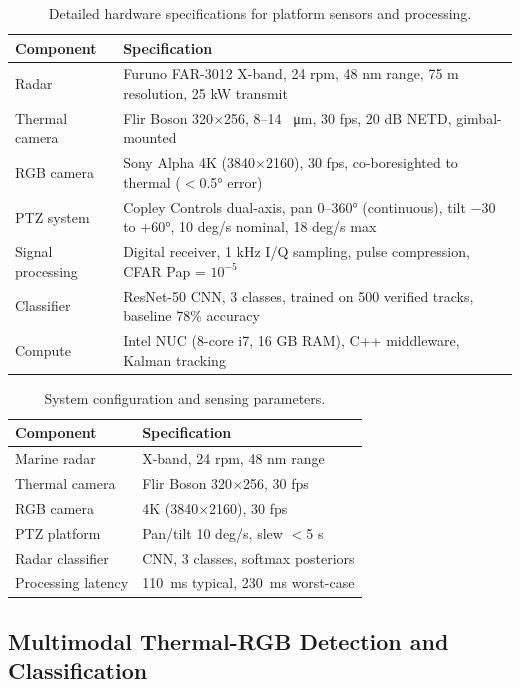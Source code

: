 \documentclass[conf]{asmeconf}
\begin{document}
\begin{table}[t]
\caption{Detailed hardware specifications for platform sensors and processing.}
\label{tab:hardware_detail}
\centering
\begin{tabular}{@{}lp{5cm}@{}}
\toprule
Component & Specification \\
\midrule
Radar & Furuno FAR-3012 X-band, 24 rpm, 48 nm range, 75 m resolution, 25 kW transmit \\
\midrule
Thermal camera & Flir Boson 320$\times$256, 8--14 \SI{}{\micro m}, 30 fps, 20 dB NETD, gimbal-mounted \\
\midrule
RGB camera & Sony Alpha 4K (3840$\times$2160), 30 fps, co-boresighted to thermal ($<$0.5° error) \\
\midrule
PTZ system & Copley Controls dual-axis, pan 0--360° (continuous), tilt $-30$ to $+60°$, 10 deg/s nominal, 18 deg/s max \\
\midrule
Signal processing & Digital receiver, 1 kHz I/Q sampling, pulse compression, CFAR Pap = $10^{-5}$ \\
\midrule
Classifier & ResNet-50 CNN, 3 classes, trained on 500 verified tracks, baseline 78\% accuracy \\
\midrule
Compute & Intel NUC (8-core i7, 16 GB RAM), C++ middleware, Kalman tracking \\
\bottomrule
\end{tabular}
\end{table}

\begin{table}[t]
\caption{System configuration and sensing parameters.}
\label{tab:system}
\centering
\begin{tabular}{@{}ll@{}}
\toprule
Component & Specification \\
\midrule
Marine radar & X-band, 24 rpm, 48 nm range \\
Thermal camera & Flir Boson 320$\times$256, 30 fps \\
RGB camera & 4K (3840$\times$2160), 30 fps \\
PTZ platform & Pan/tilt 10 deg/s, slew $<$5 s \\
Radar classifier & CNN, 3 classes, softmax posteriors \\
Processing latency & \SI{110}{ms} typical, \SI{230}{ms} worst-case \\
\bottomrule
\end{tabular}
\end{table}

\subsection{Multimodal Thermal-RGB Detection and Classification}
\end{document}
